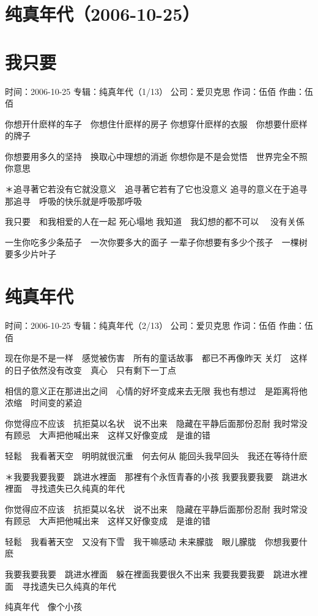 \documentclass[UTF8,a4paper,oneside,twocolumn,12pt]{ctexbook}
\newcommand{\infopair}[2]{\textbullet #1：#2}
\newcommand{\zc}[1][伍佰]{\infopair{作词}{#1}}
\newcommand{\zq}[1][伍佰]{\infopair{作曲}{#1}}
\newcommand{\zj}[1]{\infopair{专辑}{#1}}
\newcommand{\sj}[1]{\infopair{时间}{#1}}
\newcommand{\gs}[1]{\infopair{公司}{#1}}
\newenvironment{info}{\begin{flushleft}\kaishu
	}
	{\end{flushleft}\normalsize\yahei\par}
\newenvironment{lyric}{
	}
{}
\begin{document}
\section*{纯真年代（2006-10-25）}
\section{我只要}
\begin{info}
	\sj{2006-10-25}
	\zj{纯真年代（1/13）}
	\gs{爱贝克思}
	\zc
	\zq
\end{info}
\begin{lyric}
	你想开什麽样的车子　你想住什麽样的房子
	你想穿什麽样的衣服　你想要什麽样的牌子

	你想要用多久的坚持　换取心中理想的消逝
	你想你是不是会觉悟　世界完全不照你意思

	＊追寻著它若没有它就没意义　追寻著它若有了它也没意义
	追寻的意义在于追寻那追寻　呼吸的快乐就是呼吸那呼吸

	我只要　和我相爱的人在一起 死心塌地
	我知道　我幻想的都不可以　 没有关係

	一生你吃多少条茄子　一次你要多大的面子
	一辈子你想要有多少个孩子　一棵树要多少片叶子
\end{lyric}

\section{纯真年代}
\begin{info}
	\sj{2006-10-25}
	\zj{纯真年代（2/13）}
	\gs{爱贝克思}
	\zc
	\zq
\end{info}
\begin{lyric}
	现在你是不是一样　感觉被伤害　所有的童话故事　都已不再像昨天
	关灯　这样的日子依然没有改变　真心　只有剩下一丁点

	相信的意义正在那进出之间　心情的好坏变成来去无限
	我也有想过　是距离将他浓缩　时间变的紧迫

	你觉得应不应该　抗拒莫以名状　说不出来　隐藏在平静后面那份忍耐
	我时常没有顾忌　大声把他喊出来　这样又好像变成　是谁的错

	轻鬆　我看著天空　明明就很沉重　何去何从
	能回头我早回头　我还在等待什麽

	＊我要我要我要　跳进水裡面　那裡有个永恆青春的小孩
	我要我要我要　跳进水裡面　寻找遗失已久纯真的年代

	你觉得应不应该　抗拒莫以名状　说不出来　隐藏在平静后面那份忍耐
	我时常没有顾忌　大声把他喊出来　这样又好像变成　是谁的错

	轻鬆　我看著天空　又没有下雪　我干嘛感动
	未来朦胧　眼儿朦胧　你想我要什麽

	我要我要我要　跳进水裡面　躲在裡面我要很久不出来
	我要我要我要　跳进水裡面　寻找遗失已久纯真的年代

	纯真年代　像个小孩
\end{lyric}
\end{document}
